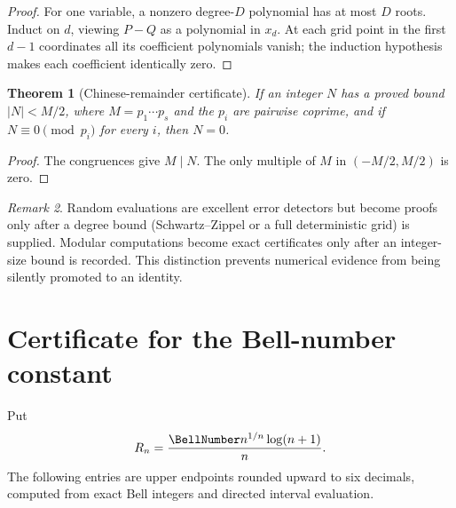 \documentclass[11pt,a4paper,oneside,openany]{book}
\newtheorem{theorem}{Theorem}[chapter]
\theoremstyle{definition}
\theoremstyle{remark}
\newtheorem{remark}[theorem]{Remark}
\begin{document}
\begin{proof}
For one variable, a nonzero degree-$D$ polynomial has at most $D$ roots.
Induct on $d$, viewing $P-Q$ as a polynomial in $x_d$.  At each grid point in
the first $d-1$ coordinates all its coefficient polynomials vanish; the
induction hypothesis makes each coefficient identically zero.
\end{proof}

\begin{theorem}[Chinese-remainder certificate]
\label{thm:merged-crt-certificate}
If an integer $N$ has a proved bound $|N|<M/2$, where
$M=p_1\cdots p_s$ and the $p_i$ are pairwise coprime, and if
$N\equiv0\pmod{p_i}$ for every $i$, then $N=0$.
\end{theorem}

\begin{proof}
The congruences give $M\mid N$.  The only multiple of $M$ in
$(-M/2,M/2)$ is zero.
\end{proof}

\begin{remark}
Random evaluations are excellent error detectors but become proofs only after
a degree bound (Schwartz--Zippel or a full deterministic grid) is supplied.
Modular computations become exact certificates only after an integer-size
bound is recorded.  This distinction prevents numerical evidence from being
silently promoted to an identity.
\end{remark}

\section{Certificate for the Bell-number constant}

Put
\begin{equation}
 R_n=\frac{\BellNumber n^{1/n}\log(n+1)}{n}.                              \label{eq:merged-bell-ratio-cert}
\end{equation}
The following entries are upper endpoints rounded upward to six decimals,
computed from exact Bell integers and directed interval evaluation.
\end{document}
